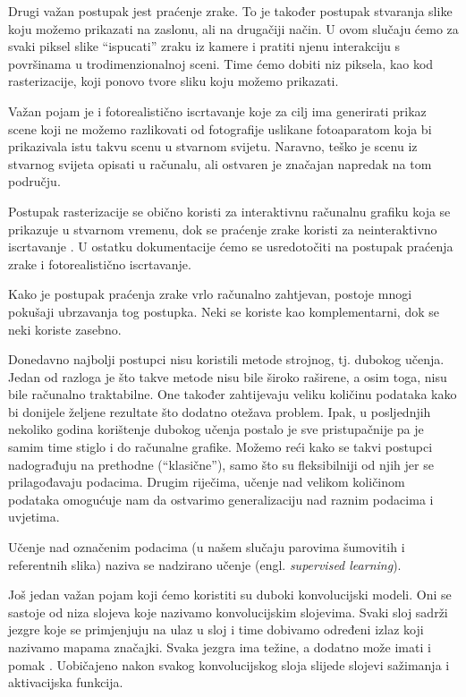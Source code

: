 \documentclass[times, utf8, seminar, numeric]{fer}
\newcommand{\eng}[1]{(engl. \textsl{#1}\/)}
\begin{document}
Drugi važan postupak jest praćenje zrake. To je također postupak stvaranja slike
koju možemo prikazati na zaslonu, ali na drugačiji način. U ovom slučaju ćemo za svaki piksel
slike ``ispucati'' zraku iz kamere i pratiti njenu interakciju s površinama u trodimenzionalnoj
sceni. Time ćemo dobiti niz piksela, kao kod rasterizacije, koji ponovo tvore sliku koju možemo
prikazati.

Važan pojam je i fotorealistično iscrtavanje koje za cilj ima generirati prikaz scene koji ne
možemo razlikovati od fotografije uslikane fotoaparatom koja bi prikazivala istu takvu scenu
u stvarnom svijetu. Naravno, teško je scenu iz stvarnog svijeta opisati u računalu, ali
ostvaren je značajan napredak na tom području.

Postupak rasterizacije se obično koristi za interaktivnu računalnu grafiku koja se prikazuje u
stvarnom vremenu, dok se praćenje zrake koristi za neinteraktivno iscrtavanje . U ostatku dokumentacije ćemo se usredotočiti na postupak praćenja zrake i
fotorealistično iscrtavanje.

Kako je postupak praćenja zrake vrlo računalno zahtjevan, postoje mnogi pokušaji ubrzavanja tog
postupka. Neki se koriste kao komplementarni, dok se neki koriste zasebno.

Donedavno najbolji postupci nisu koristili metode strojnog, tj. dubokog učenja. Jedan od razloga
je što takve metode nisu bile široko raširene, a osim toga, nisu bile računalno traktabilne. One
također zahtijevaju veliku količinu podataka kako bi donijele željene rezultate što dodatno
otežava problem. Ipak, u posljednjih nekoliko godina korištenje dubokog učenja postalo je sve
pristupačnije pa je samim time stiglo i do računalne grafike. Možemo reći kako se takvi postupci
nadograđuju na prethodne (``klasične''), samo što su fleksibilniji od njih jer se prilagođavaju
podacima. Drugim riječima, učenje nad velikom količinom podataka omogućuje nam da ostvarimo
generalizaciju nad raznim podacima i uvjetima.

Učenje nad označenim podacima (u našem slučaju parovima šumovitih i referentnih slika) naziva
se nadzirano učenje \eng{supervised learning}.

Još jedan važan pojam koji ćemo koristiti su duboki konvolucijski modeli. Oni se
sastoje od niza slojeva koje nazivamo konvolucijskim slojevima. Svaki sloj sadrži jezgre koje
se primjenjuju na ulaz u sloj i time dobivamo određeni izlaz koji nazivamo mapama značajki.
Svaka jezgra ima težine, a dodatno može imati i pomak .
Uobičajeno nakon svakog konvolucijskog sloja slijede slojevi sažimanja i aktivacijska funkcija.
\end{document}
